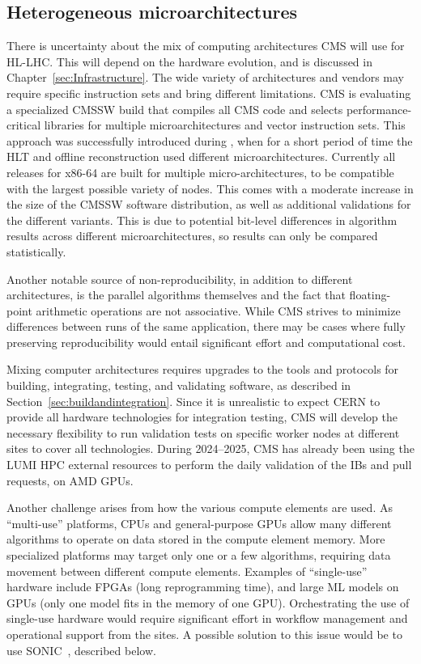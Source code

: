 \subsection{Heterogeneous microarchitectures}
\label{sec:heteroarchi}

There is uncertainty about the mix of computing architectures CMS will use for \gls{HL-LHC}. This will depend on the hardware evolution, and is discussed in Chapter~\ref{sec:Infrastructure}. The wide variety of architectures and vendors may require specific instruction sets and bring different limitations.
CMS is evaluating a specialized \gls{CMSSW} build that compiles all CMS code and selects performance-critical libraries for multiple microarchitectures and vector instruction sets.
This approach was successfully introduced during \RunThree, when for a short period of time the \gls{HLT} and offline reconstruction used different microarchitectures. Currently all releases for x86-64 are built for multiple micro-architectures, to be compatible with the largest possible variety of nodes. This comes with a moderate increase in the size of the \gls{CMSSW} software distribution, as well as additional validations for the different variants.
This is due to potential bit-level differences in algorithm results across different microarchitectures, so results can only be compared statistically.

Another notable source of non-reproducibility, in addition to different architectures, is the parallel algorithms themselves and the fact that floating-point arithmetic operations are not associative. While CMS strives to minimize differences between runs of the same application, there may be cases where fully preserving reproducibility would entail significant effort and computational cost. 

Mixing computer architectures requires upgrades to the tools and protocols for building, integrating, testing, and validating software, as described in Section~\ref{sec:buildandintegration}. Since it is unrealistic to expect CERN to provide all hardware technologies for integration testing, CMS will develop the necessary flexibility to run validation tests on specific worker nodes at different sites to cover all technologies. During 2024--2025, CMS has already been using the LUMI HPC external resources to perform the daily validation of the \glspl{IB} and pull requests, on AMD \glspl{GPU}.

Another challenge arises from how the various compute elements are used. As ``multi-use'' platforms, \glspl{CPU} and general-purpose \glspl{GPU} allow many different algorithms to operate on data stored in the compute element memory. More specialized platforms may target only one or a few algorithms, requiring data movement between different compute elements. Examples of ``single-use'' hardware include FPGAs (long reprogramming time), and large \gls{ML} models on \glspl{GPU} (only one model fits in the memory of one \gls{GPU}). Orchestrating the use of single-use hardware would require significant effort in workflow management and operational support from the sites.  A possible solution to this issue would be to use \gls{SONIC}~\cite{CMS:2024twn}, described below.

